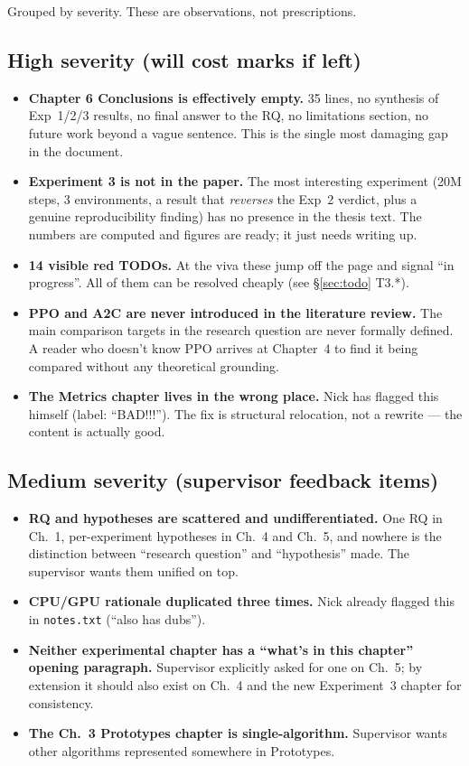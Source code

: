 \documentclass[11pt,a4paper]{article}
\newcommand{\fileline}[1]{\texttt{\small #1}}
\begin{document}
Grouped by severity. These are observations, not prescriptions.

\subsection*{High severity (will cost marks if left)}

\begin{itemize}[leftmargin=*]
  \item \textbf{Chapter 6 Conclusions is effectively empty.} 35 lines,
  no synthesis of Exp~1/2/3 results, no final answer to the RQ, no
  limitations section, no future work beyond a vague sentence. This is
  the single most damaging gap in the document.
  \item \textbf{Experiment 3 is not in the paper.} The most interesting
  experiment (20M steps, 3 environments, a result that \emph{reverses}
  the Exp~2 verdict, plus a genuine reproducibility finding) has no
  presence in the thesis text. The numbers are computed and figures are
  ready; it just needs writing up.
  \item \textbf{14 visible red TODOs.} At the viva these jump off the
  page and signal ``in progress''. All of them can be resolved cheaply
  (see \S\ref{sec:todo} T3.*).
  \item \textbf{PPO and A2C are never introduced in the literature review.}
  The main comparison targets in the research question are never formally
  defined. A reader who doesn't know PPO arrives at Chapter~4 to find it
  being compared without any theoretical grounding.
  \item \textbf{The Metrics chapter lives in the wrong place.} Nick has
  flagged this himself (label: ``BAD!!!''). The fix is structural
  relocation, not a rewrite --- the content is actually good.
\end{itemize}

\subsection*{Medium severity (supervisor feedback items)}

\begin{itemize}[leftmargin=*]
  \item \textbf{RQ and hypotheses are scattered and undifferentiated.}
  One RQ in Ch.~1, per-experiment hypotheses in Ch.~4 and Ch.~5, and
  nowhere is the distinction between ``research question'' and
  ``hypothesis'' made. The supervisor wants them unified on top.
  \item \textbf{CPU/GPU rationale duplicated three times.} Nick already
  flagged this in \fileline{notes.txt} (``also has dubs'').
  \item \textbf{Neither experimental chapter has a ``what's in this
  chapter'' opening paragraph.} Supervisor explicitly asked for one on
  Ch.~5; by extension it should also exist on Ch.~4 and the new
  Experiment~3 chapter for consistency.
  \item \textbf{The Ch.~3 Prototypes chapter is single-algorithm.}
  Supervisor wants other algorithms represented somewhere in Prototypes.
\end{itemize}
\end{document}
